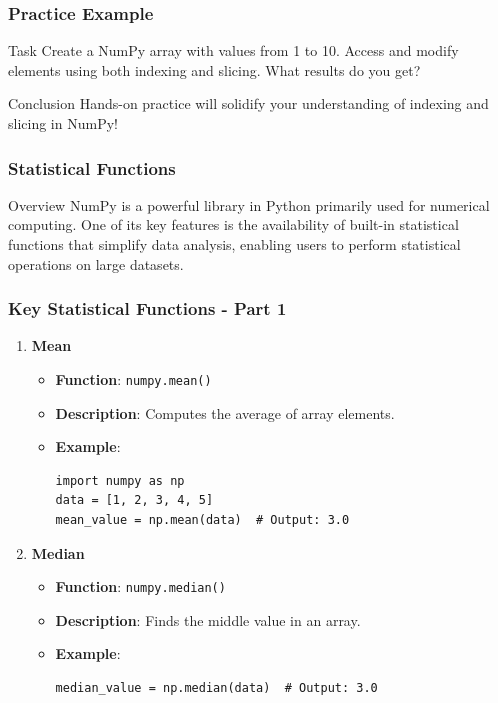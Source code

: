 \documentclass{beamer}
\begin{document}
\begin{frame}[fragile]
    \frametitle{Practice Example}
    \begin{block}{Task}
        Create a NumPy array with values from 1 to 10. Access and modify elements using both indexing and slicing. What results do you get?
    \end{block}
    \begin{block}{Conclusion}
        Hands-on practice will solidify your understanding of indexing and slicing in NumPy!
    \end{block}
\end{frame}

\begin{frame}
    \frametitle{Statistical Functions}
    \begin{block}{Overview}
        NumPy is a powerful library in Python primarily used for numerical computing. 
        One of its key features is the availability of built-in statistical functions that simplify data analysis, enabling users to perform statistical operations on large datasets.
    \end{block}
\end{frame}

\begin{frame}[fragile]
    \frametitle{Key Statistical Functions - Part 1}
    \begin{enumerate}
        \item \textbf{Mean}
        \begin{itemize}
            \item \textbf{Function}: \texttt{numpy.mean()}
            \item \textbf{Description}: Computes the average of array elements.
            \item \textbf{Example}:
            \begin{lstlisting}
import numpy as np
data = [1, 2, 3, 4, 5]
mean_value = np.mean(data)  # Output: 3.0
            \end{lstlisting}
        \end{itemize}
        
        \item \textbf{Median}
        \begin{itemize}
            \item \textbf{Function}: \texttt{numpy.median()}
            \item \textbf{Description}: Finds the middle value in an array.
            \item \textbf{Example}:
            \begin{lstlisting}
median_value = np.median(data)  # Output: 3.0
            \end{lstlisting}
        \end{itemize}
    \end{enumerate}
\end{frame}
\end{document}
